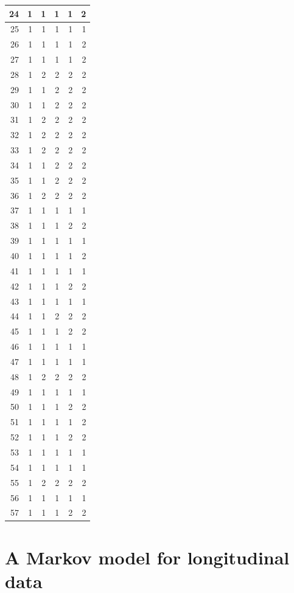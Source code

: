 \documentclass[
  12pt,
]{krantz}
\begin{document}
\begin{tabular}{r|r|r|r|r|r}
\hline
24 & 1 & 1 & 1 & 1 & 2\\
\hline
25 & 1 & 1 & 1 & 1 & 1\\
\hline
26 & 1 & 1 & 1 & 1 & 2\\
\hline
27 & 1 & 1 & 1 & 1 & 2\\
\hline
28 & 1 & 2 & 2 & 2 & 2\\
\hline
29 & 1 & 1 & 2 & 2 & 2\\
\hline
30 & 1 & 1 & 2 & 2 & 2\\
\hline
31 & 1 & 2 & 2 & 2 & 2\\
\hline
32 & 1 & 2 & 2 & 2 & 2\\
\hline
33 & 1 & 2 & 2 & 2 & 2\\
\hline
34 & 1 & 1 & 2 & 2 & 2\\
\hline
35 & 1 & 1 & 2 & 2 & 2\\
\hline
36 & 1 & 2 & 2 & 2 & 2\\
\hline
37 & 1 & 1 & 1 & 1 & 1\\
\hline
38 & 1 & 1 & 1 & 2 & 2\\
\hline
39 & 1 & 1 & 1 & 1 & 1\\
\hline
40 & 1 & 1 & 1 & 1 & 2\\
\hline
41 & 1 & 1 & 1 & 1 & 1\\
\hline
42 & 1 & 1 & 1 & 2 & 2\\
\hline
43 & 1 & 1 & 1 & 1 & 1\\
\hline
44 & 1 & 1 & 2 & 2 & 2\\
\hline
45 & 1 & 1 & 1 & 2 & 2\\
\hline
46 & 1 & 1 & 1 & 1 & 1\\
\hline
47 & 1 & 1 & 1 & 1 & 1\\
\hline
48 & 1 & 2 & 2 & 2 & 2\\
\hline
49 & 1 & 1 & 1 & 1 & 1\\
\hline
50 & 1 & 1 & 1 & 2 & 2\\
\hline
51 & 1 & 1 & 1 & 1 & 2\\
\hline
52 & 1 & 1 & 1 & 2 & 2\\
\hline
53 & 1 & 1 & 1 & 1 & 1\\
\hline
54 & 1 & 1 & 1 & 1 & 1\\
\hline
55 & 1 & 2 & 2 & 2 & 2\\
\hline
56 & 1 & 1 & 1 & 1 & 1\\
\hline
57 & 1 & 1 & 1 & 2 & 2\\
\hline
\end{tabular}

\hypertarget{a-markov-model-for-longitudinal-data}{%
\section{A Markov model for longitudinal data}\label{a-markov-model-for-longitudinal-data}}
\end{document}
